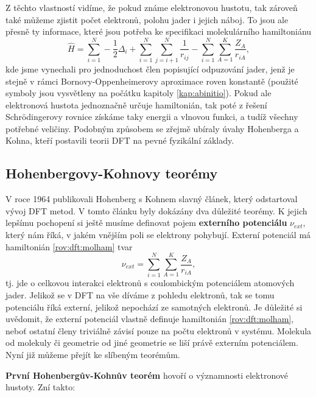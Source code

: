 Z těchto vlastností vidíme, že pokud známe elektronovou hustotu, tak zároveň také můžeme zjistit počet elektronů, polohu jader i jejich náboj. To jsou ale přesně ty informace, které jsou potřeba ke specifikaci molekulárního hamiltoniánu
\begin{equation}
\hat{H}=\sum_{i=1}^N -\frac{1}{2}\Delta_i+\sum_{i=1}^N\sum_{j=i+1}^N\frac{1}{r_{ij}}-\sum_{i=1}^N\sum_{A=1}^K \frac{Z_A}{r_{iA}} ,
\label{rov:dft:molham}
\end{equation}
kde jsme vynechali pro jednoduchost člen popisující odpuzování jader, jenž je stejně v rámci Bornovy-Oppenheimerovy aproximace roven konstantě (použité symboly jsou vysvětleny na počátku kapitoly \ref{kap:abinitio}). Pokud ale elektronová hustota jednoznačně určuje hamiltonián, tak poté z řešení Schr\"odingerovy rovnice získáme taky energii a vlnovou funkci, a tudíž všechny potřebné veličiny. Podobným způsobem se zřejmě ubíraly úvahy Hohenberga a Kohna, kteří postavili teorii DFT na pevné fyzikální základy.

\subsection{Hohenbergovy-Kohnovy teorémy}

V roce 1964 publikovali Hohenberg s Kohnem slavný článek, který odstartoval vývoj DFT metod.
V tomto článku byly dokázány dva důležité teorémy. K jejich lepšímu pochopení si ještě musíme definovat pojem \textbf{externího potenciálu} $\nu_{ext}$, který nám říká, v jakém vnějším poli se elektrony pohybují. Externí potenciál má hamiltonián \eqref{rov:dft:molham} tvar
\begin{equation}
\nu_{ext} = \sum_{i=1}^N\sum_{A=1}^K \frac{Z_A}{r_{iA}} ,
\end{equation} 
tj. jde o celkovou interakci elektronů s coulombickým potenciálem atomových jader. Jelikož se v DFT na vše díváme z pohledu elektronů, tak se tomu potenciálu říká externí, jelikož nepochází ze samotných elektronů. Je důležité si uvědomit, že externí potenciál vlastně definuje hamiltonián \eqref{rov:dft:molham}, neboť ostatní členy triviálně závisí pouze na počtu elektronů v systému. Molekula od molekuly či geometrie od jiné geometrie se liší právě externím potenciálem. Nyní již můžeme přejít ke slíbeným teorémům.

\textbf{První Hohenbergův-Kohnův teorém} hovoří o významnosti elektronové hustoty. Zní takto:

\bigskip
\noindent {}

